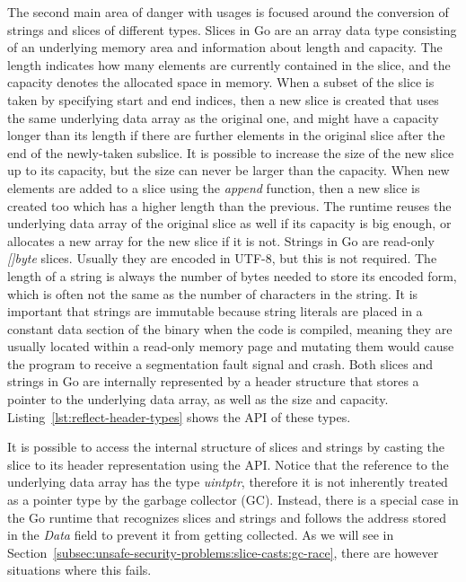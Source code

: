 The second main area of danger with \unsafe{} usages is focused around the conversion of strings and slices of different
types.
Slices in Go are an array data type consisting of an underlying memory area and information about length and capacity.
The length indicates how many elements are currently contained in the slice, and the capacity denotes the allocated
space in memory.
When a subset of the slice is taken by specifying start and end indices, then a new slice is created that uses the same
underlying data array as the original one, and might have a capacity longer than its length if there are further
elements in the original slice after the end of the newly-taken subslice.
It is possible to increase the size of the new slice up to its capacity, but the size can never be larger than the
capacity.
When new elements are added to a slice using the \textit{append} function, then a new slice is created too which has a
higher length than the previous.
The runtime reuses the underlying data array of the original slice as well if its capacity is big enough, or allocates
a new array for the new slice if it is not.
Strings in Go are read-only \textit{[]byte} slices.
Usually they are encoded in UTF-8, but this is not required.
The length of a string is always the number of bytes needed to store its encoded form, which is often not the same as
the number of characters in the string.
It is important that strings are immutable because string literals are placed in a constant data section of the binary
when the code is compiled, meaning they are usually located within a read-only memory page and mutating them would cause
the program to receive a segmentation fault signal and crash.
Both slices and strings in Go are internally represented by a header structure that stores a pointer to the underlying
data array, as well as the size and capacity.
Listing~\ref{lst:reflect-header-types} shows the \acrshort{API} of these types.



It is possible to access the internal structure of slices and strings by casting the slice to its header representation
using the \unsafe{} API.
Notice that the reference to the underlying data array has the type \textit{uintptr}, therefore it is not inherently
treated as a pointer type by the garbage collector (\acrshort{GC}).
Instead, there is a special case in the Go runtime that recognizes slices and strings and follows the address stored in
the \textit{Data} field to prevent it from getting collected.
As we will see in Section~\ref{subsec:unsafe-security-problems:slice-casts:gc-race}, there are however situations where
this fails.


